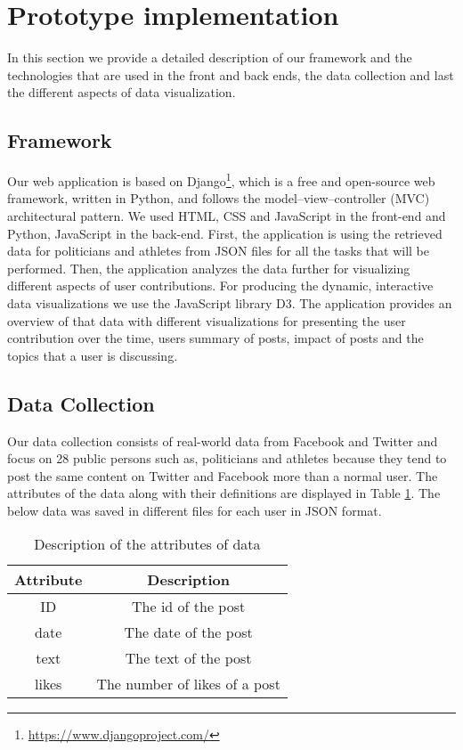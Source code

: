 \section{Prototype implementation}

In this section we provide a detailed description of our framework and the technologies that are used in the front and back ends, the data collection and last the different aspects of data visualization.


\subsection{Framework}

Our web application is based on Django\footnote{\url{https://www.djangoproject.com/}}, which is a free and open-source web framework, written in Python, and follows the model–view–controller (MVC) architectural pattern. We used HTML, CSS and JavaScript in the front-end and Python, JavaScript in the back-end. First, the application is using the retrieved data for politicians and athletes from JSON files for all the tasks that will be performed. Then, the application analyzes the data further for visualizing different aspects of user contributions. For producing the dynamic, interactive data visualizations we use the JavaScript library D3.
The application provides an overview of that data with different visualizations for presenting the user contribution over the time, users summary of posts, impact of posts and the topics that a user is discussing.


\subsection{Data Collection}

Our data collection consists of real-world data from Facebook 
and Twitter and focus on 28 public persons such as, politicians 
and athletes because they tend to post the same content on Twitter and Facebook more than a normal user. The attributes of the data along with their definitions are displayed in Table \ref{table:attrib_des}. The below data was saved in different files for each user in JSON format.

\begin{table}[ht] 
\caption{Description of the attributes of data} 
\centering  
\begin{tabular}{c | c} 
\hline\hline 
Attribute & Description \\ [0.5ex] 
\hline 
ID & The id of the post \\ 
date & The date of the post \\ 
text & The text of the post\\ 
likes & The number of likes of a post \\ [1ex]  
\hline  
\end{tabular} 
\label{table:attrib_des}
\end{table}

